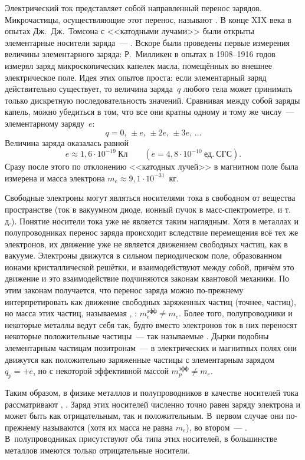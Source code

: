 Электрический ток представляет собой направленный перенос зарядов. Микрочастицы,
осуществляющие этот перенос, называют . В конце
XIX века в опытах Дж.~Дж.~Томсона с <<катодными лучами>> были открыты
элементарные носители заряда~--- . Вскоре были проведены
первые измерения величины элементарного заряда: Р.~Милликен
в опытах в 1908--1916 годов измерял заряд микроскопических капелек масла,
помещённых во внешнее электрическое поле. Идея этих опытов проста:
если элементарный заряд действительно существует, то величина заряда~$q$
любого тела может принимать только дискретную последовательность значений.
Сравнивая между собой заряды капель, можно убедиться в том, что все они
кратны одному и тому же числу~--- элементарному заряду~$e$:
\begin{equation*}
    q = 0,\,\pm e,\,\pm2e,\,\pm3e,\, \ldots
\end{equation*}
Величина заряда оказалась равной
\[
e\approx1,6\cdot 10^{-19}~Кл\qquad (e=4,8\cdot 10^{-10}~ед.~СГС).
\]
Сразу после этого по отклонению <<катодных лучей>> в магнитном поле была
измерена и масса электрона $m_e\approx 9,1\cdot 10^{-31}$~кг.

Свободные электроны могут являться носителями тока в свободном от вещества
пространстве (ток в вакуумном диоде, ионный пучок в масс-спектрометре, и
т.\,д.). Понятие носители тока  уже не является таким
наглядным. Хотя в металлах и полупроводниках перенос заряда происходит
вследствие перемещения всё тех же электронов, их движение уже не является
движением свободных частиц, как в вакууме. Электроны движутся в сильном
периодическом поле, образованном ионами кристаллической решётки, и
взаимодействуют между собой, причём это движение и это взаимодействие
подчиняются законам квантовой механики. По этим законам получается, что перенос
заряда можно по-прежнему интерпретировать как движение свободных заряженных
частиц (точнее, частиц), но масса этих частиц, называемая
, : $m_{e}^{эфф}\ne m_e$. Более того, полупроводники и некоторые металлы
ведут себя так, будто вместо электронов ток в них переносят некоторые
положительные частицы~--- так называемые . Дырки подобны
элементарным частицам позитронам~--- в электрических и магнитных полях они
движутся как положительно заряженные частицы с элементарным зарядом $q_p=+e$, но
с некоторой эффективной массой $m_p^{эфф}\ne m_e$.

Таким образом, в физике металлов и полупроводников в качестве носителей тока
рассматривают ,
.
Заряд этих носителей численно точно равен заряду электрона и может быть как
отрицательным, так и положительным. В~первом случае они по-прежнему называются
 (хотя их масса не равна $m_e$),
во втором~--- . В~полупроводниках присутствуют оба типа этих
носителей, в большинстве металлов имеются только отрицательные носители.


